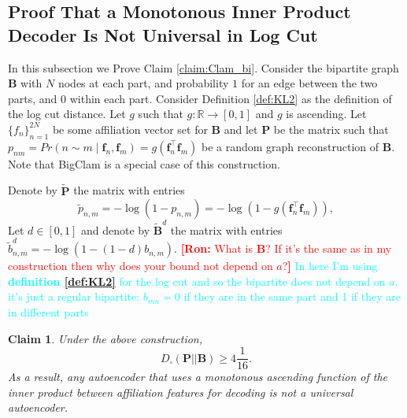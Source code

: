 \documentclass[letterpaper]{article} %
\newtheorem{claim}[theorem]{Claim}
\newcommand{\ron}[1]{{{\textcolor{red}{\textbf{[Ron:} {#1}\textbf{]}}}}}
\begin{document}
\subsection{Proof That a Monotonous Inner Product Decoder Is Not Universal in Log Cut}
In this subsection we Prove Claim \ref{claim:Clam_bi}. 
Consider the bipartite graph $\mathbf{B}$ with $N$ nodes at each part, and probability $1$ for an edge between the two parts, and $0$ within each part. Consider Definition \ref{def:KL2} as the definition of the log cut distance.
Let $g$ such that $g: \mathbb{R} \rightarrow [0,1]$ and $g$ is ascending. 
Let $\{f_n\}_{n=1}^{2N}$ be some affiliation vector set for $\mathbf{B}$ and let $\mathbf{P}$ be the matrix such that $p_{nm} = Pr(n\sim m \mid \mathbf{f}_n, \mathbf{f}_m) = g(\mathbf{f}_n^\top \mathbf{f}_m)$ be a random graph reconstruction of $\mathbf{B}$. Note that BigClam is a special case of this construction.

Denote by $\tilde{\mathbf{P}}$ the matrix with entries 
\[\tilde{p}_{n,m}=-\log(1-p_{n,m})=-\log(1-g(\mathbf{f}_n^\top \mathbf{f}_m)),\]
Let $d\in [0,1]$ and denote by $\tilde{\mathbf{B}}^d$ the matrix  with entries $\tilde{b}^d_{n,m}=-\log(1-(1-d)b_{n,m})$. \ron{What is $\mathbf{B}$? If it's the same as in my construction then why does your bound not depend on $a$?}
\textcolor{cyan}{In here I'm using \textbf{definition \ref{def:KL2}} for the log cut and so the bipartite does not depend on $a$. it's just a regular bipartite: $b_{mn} = 0$ if they are in the same part and 1 if they are in different parts}
\begin{claim}
    Under the above construction, 
    \[D_{\square}(\mathbf{P} || \mathbf{B}) \geq 4\frac{1}{16}.\]
    As a result, any autoencoder that uses a monotonous ascending function of the inner product between affiliation features for decoding is not a universal autoencoder.
\end{claim}
\end{document}
